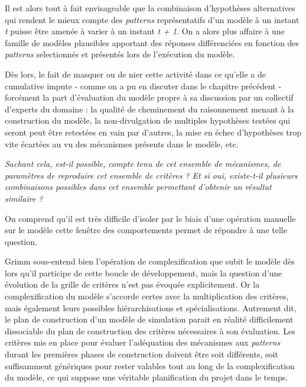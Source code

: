 Il est alors tout à fait envisageable que la combinaison d'hypothèses alternatives qui rendent le mieux compte des \textit{patterns} représentatifs d'un modèle à un instant \textit{t} puisse être amenée à varier à un instant \textit{t + 1}. On a alors plus affaire à une famille de modèles plausibles apportant des réponses différenciées en fonction des \textit{patterns} selectionnés et présentés lors de l'exécution du modèle.

Dès lors, le fait de masquer ou de nier cette activité dans ce qu'elle a de cumulative impute - comme on a pu en discuter dans le chapitre précédent - forcément la part d'évaluation du modèle propre à sa discussion par un collectif d'experts du domaine : la qualité de cheminement du raisonnement menant à la construction du modèle, la non-divulgation de multiples hypothèses testées qui seront peut être retestées en vain par d'autres, la mise en échec d'hypothèses trop vite écartées au vu des mécanismes présents dans le modèle, etc.



\textit{Sachant cela, est-il possible, compte tenu de cet ensemble de mécanismes, de paramètres de reproduire cet ensemble de critères ? Et si oui, existe-t-il plusieurs combinaisons possibles dans cet ensemble permettant d'obtenir un résultat similaire ?}

On comprend qu'il est très difficile d'isoler par le biais d'une opération manuelle sur le modèle cette fenêtre des comportements permet de répondre à une telle question. 

Grimm sous-entend bien l'opération de complexification que subit le modèle dès lors qu'il participe de cette boucle de développement, mais la question d'une évolution de la grille de critères n'est pas évoquée explicitement. Or la complexification du modèle s'accorde certes avec la multiplication des critères, mais également leurs possibles hiérarchisations et spécialisations. Autrement dit, le plan de construction d'un modèle de simulation parait en réalité difficilement dissociable du plan de construction des critères nécessaires à son évaluation. Les critères mis en place pour évaluer l'adéquation des mécanismes aux \textit{patterns} durant les premières phases de construction doivent être soit différents, soit suffisamment génériques pour rester valables tout au long de la complexification du modèle, ce qui suppose une véritable planification du projet dans le temps.

